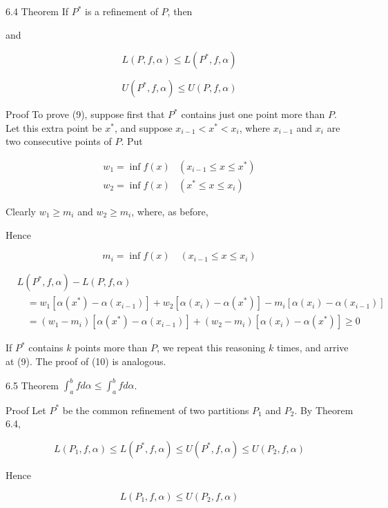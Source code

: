 \documentclass[10pt]{article}
\begin{document}
6.4 Theorem If $P^{*}$ is a refinement of $P$, then

and

$$
L(P, f, \alpha) \leq L\left(P^{*}, f, \alpha\right)
$$

$$
U\left(P^{*}, f, \alpha\right) \leq U(P, f, \alpha)
$$

Proof To prove (9), suppose first that $P^{*}$ contains just one point more than $P$. Let this extra point be $x^{*}$, and suppose $x_{i-1}<x^{*}<x_{i}$, where $x_{i-1}$ and $x_{i}$ are two consecutive points of $P$. Put

$$
\begin{array}{ll}
w_{1}=\inf f(x) & \left(x_{i-1} \leq x \leq x^{*}\right) \\
w_{2}=\inf f(x) & \left(x^{*} \leq x \leq x_{i}\right)
\end{array}
$$

Clearly $w_{1} \geq m_{i}$ and $w_{2} \geq m_{i}$, where, as before,

Hence

$$
m_{i}=\inf f(x) \quad\left(x_{i-1} \leq x \leq x_{i}\right)
$$

$$
\begin{aligned}
& L\left(P^{*}, f, \alpha\right)-L(P, f, \alpha) \\
& \quad=w_{1}\left[\alpha\left(x^{*}\right)-\alpha\left(x_{i-1}\right)\right]+w_{2}\left[\alpha\left(x_{i}\right)-\alpha\left(x^{*}\right)\right]-m_{i}\left[\alpha\left(x_{i}\right)-\alpha\left(x_{i-1}\right)\right] \\
& \quad=\left(w_{1}-m_{i}\right)\left[\alpha\left(x^{*}\right)-\alpha\left(x_{i-1}\right)\right]+\left(w_{2}-m_{i}\right)\left[\alpha\left(x_{i}\right)-\alpha\left(x^{*}\right)\right] \geq 0
\end{aligned}
$$

If $P^{*}$ contains $k$ points more than $P$, we repeat this reasoning $k$ times, and arrive at (9). The proof of (10) is analogous.

6.5 Theorem $\int_{a}^{b} f d \alpha \leq \int_{a}^{b} f d \alpha$.

Proof Let $P^{*}$ be the common refinement of two partitions $P_{1}$ and $P_{2}$. By Theorem 6.4,

$$
L\left(P_{1}, f, \alpha\right) \leq L\left(P^{*}, f, \alpha\right) \leq U\left(P^{*}, f, \alpha\right) \leq U\left(P_{2}, f, \alpha\right)
$$

Hence

$$
L\left(P_{1}, f, \alpha\right) \leq U\left(P_{2}, f, \alpha\right)
$$
\end{document}

